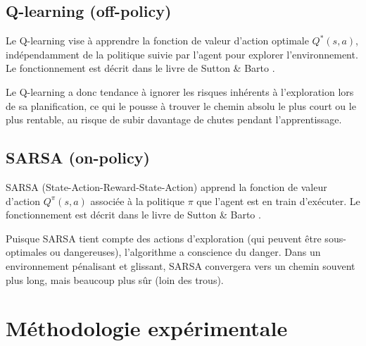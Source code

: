 \documentclass{article}
\begin{document}
\subsection{Q-learning (off-policy)}

Le Q-learning vise à apprendre la fonction de valeur d'action optimale $Q^*(s, a)$, indépendamment de la politique suivie par l'agent pour explorer l'environnement. Le fonctionnement est décrit dans le livre de Sutton \& Barto \cite{rlbook}.

Le Q-learning a donc tendance à ignorer les risques inhérents à l'exploration lors de sa planification, ce qui le pousse à trouver le chemin absolu le plus court ou le plus rentable, au risque de subir davantage de chutes pendant l'apprentissage.

\subsection{SARSA (on-policy)}

SARSA (State-Action-Reward-State-Action) apprend la fonction de valeur d'action $Q^\pi(s, a)$ associée à la politique $\pi$ que l'agent est en train d'exécuter. Le fonctionnement est décrit dans le livre de Sutton \& Barto \cite{rlbook}.


Puisque SARSA tient compte des actions d'exploration (qui peuvent être sous-optimales ou dangereuses), l'algorithme a conscience du danger. Dans un environnement pénalisant et glissant, SARSA convergera vers un chemin souvent plus long, mais beaucoup plus sûr (loin des trous).

\section{Méthodologie expérimentale}
\end{document}
